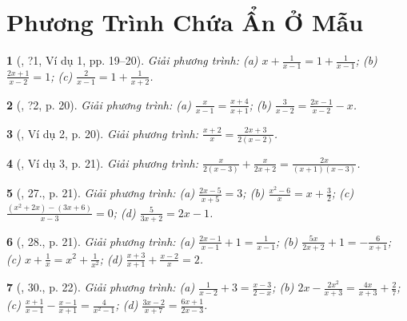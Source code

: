 \documentclass{article}
\newtheorem{baitoan}{}
\begin{document}

\section{Phương Trình Chứa Ẩn Ở Mẫu}

\begin{baitoan}[\cite{SGK_Toan_8_tap_2}, ?1, Ví dụ 1, pp. 19--20]
	Giải phương trình: (a) $x + \frac{1}{x - 1} = 1 + \frac{1}{x - 1}$; (b) $\frac{2x + 1}{x - 2} = 1$; (c) $\frac{2}{x - 1} = 1 + \frac{1}{x + 2}$.
\end{baitoan}

\begin{baitoan}[\cite{SGK_Toan_8_tap_2}, ?2, p. 20]
	Giải phương trình: (a) $\frac{x}{x - 1} = \frac{x + 4}{x + 1}$; (b) $\frac{3}{x - 2} = \frac{2x - 1}{x - 2} - x$.
\end{baitoan}

\begin{baitoan}[\cite{SGK_Toan_8_tap_2}, Ví dụ 2, p. 20]
	Giải phương trình: $\frac{x + 2}{x} = \frac{2x + 3}{2(x - 2)}$.
\end{baitoan}

\begin{baitoan}[\cite{SGK_Toan_8_tap_2}, Ví dụ 3, p. 21]
	Giải phương trình: $\frac{x}{2(x - 3)} + \frac{x}{2x + 2} = \frac{2x}{(x + 1)(x - 3)}$.
\end{baitoan}

\begin{baitoan}[\cite{SGK_Toan_8_tap_2}, 27., p. 21]
	Giải phương trình: (a) $\frac{2x - 5}{x + 5} = 3$; (b) $\frac{x^2 - 6}{x} = x + \frac{3}{2}$; (c) $\frac{(x^2 + 2x) - (3x + 6)}{x - 3} = 0$; (d) $\frac{5}{3x + 2} = 2x - 1$.
\end{baitoan}

\begin{baitoan}[\cite{SGK_Toan_8_tap_2}, 28., p. 21]
	Giải phương trình: (a) $\frac{2x - 1}{x - 1} + 1 = \frac{1}{x - 1}$; (b) $\frac{5x}{2x + 2} + 1 = -\frac{6}{x + 1}$; (c) $x + \frac{1}{x} = x^2 + \frac{1}{x^2}$; (d) $\frac{x + 3}{x + 1} + \frac{x - 2}{x} = 2$.
\end{baitoan}

\begin{baitoan}[\cite{SGK_Toan_8_tap_2}, 30., p. 22]
	Giải phương trình: (a) $\frac{1}{x - 2} + 3 = \frac{x - 3}{2 - x}$; (b) $2x - \frac{2x^2}{x + 3} = \frac{4x}{x + 3} + \frac{2}{7}$; (c) $\frac{x + 1}{x - 1} - \frac{x - 1}{x + 1} = \frac{4}{x^2 - 1}$; (d) $\frac{3x - 2}{x + 7} = \frac{6x + 1}{2x - 3}$.
\end{baitoan}
\end{document}
